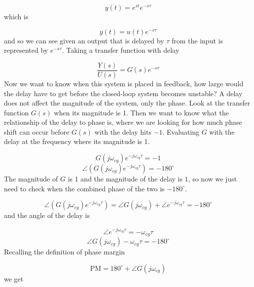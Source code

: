 \begin{equation*}
  y(t)=e^{st}e^{-s\tau}
\end{equation*}
which is

\begin{equation*}
  y(t)=u(t)e^{-s\tau}
\end{equation*}
and so we can see given an output that is delayed by $\tau$ from the input is represented by $e^{-s\tau}$.
Taking a transfer function with delay

\begin{equation*}
  \frac{Y(s)}{U(s)}=G(s)e^{-s\tau}
\end{equation*}
Now we want to know when this system is placed in feedback, how large would the delay have to get before the closed-loop system becomes unstable? A delay does not affect the magnitude of the system, only the phase.
Look at the transfer function $G(s)$ when its magnitude is 1.
Then we want to know what the relationship of the delay to phase is, where we are looking for how much phase shift can occur before $G(s)$ with the delay hits $-1$.
Evaluating $G$ with the delay at the frequency where its magnitude is 1.

\begin{equation*}
  G(j\omega_{cg})e^{-j\omega_{cg}\tau}=-1
\end{equation*}
\begin{equation*}
  \angle(G(j\omega_{cg})e^{-j\omega_{cg}\tau})=-180^{\circ}
\end{equation*}
The magnitude of $G$ is 1 and the magnitude of the delay is $1$, so now we just need to check when the combined phase of the two is $-180^{\circ}$.

\begin{equation*}
  \angle(G(j\omega_{cg})e^{-j\omega_{cg}\tau})=\angle G(j\omega_{cg})+\angle e^{-j\omega_{cg}\tau}=-180^{\circ}
\end{equation*}
and the angle of the delay is

\begin{equation*}
  \angle e^{-j\omega_{cg}\tau}=-\omega_{cg}\tau
\end{equation*}
\begin{equation*}
  \angle G(j\omega_{cg})-\omega_{cg}\tau=-180^{\circ}
\end{equation*}
Recalling the definition of phase margin

\begin{equation*}
  \text{PM}=180^{\circ}+\angle G(j\omega_{cg})
\end{equation*}
we get

